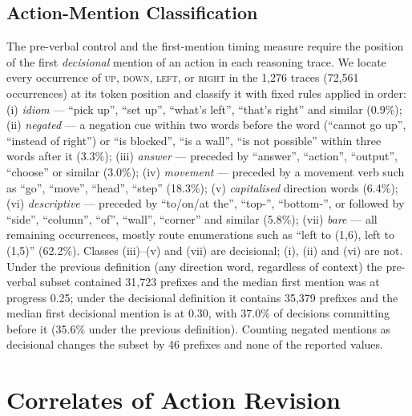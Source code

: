 \documentclass{article}
\begin{document}
\subsection{Action-Mention Classification}
\label{app:action-mentions}
The pre-verbal control and the first-mention timing measure require the position of the first \emph{decisional} mention of an action in each reasoning trace.
We locate every occurrence of \textsc{up}, \textsc{down}, \textsc{left}, or \textsc{right} in the 1,276 traces (72,561 occurrences) at its token position and classify it with fixed rules applied in order: (i) \emph{idiom} --- ``pick up'', ``set up'', ``what's left'', ``that's right'' and similar (0.9\%); (ii) \emph{negated} --- a negation cue within two words before the word (``cannot go up'', ``instead of right'') or ``is blocked'', ``is a wall'', ``is not possible'' within three words after it (3.3\%); (iii) \emph{answer} --- preceded by ``answer'', ``action'', ``output'', ``choose'' or similar (3.0\%); (iv) \emph{movement} --- preceded by a movement verb such as ``go'', ``move'', ``head'', ``step'' (18.3\%); (v) \emph{capitalised} direction words (6.4\%); (vi) \emph{descriptive} --- preceded by ``to/on/at the'', ``top-'', ``bottom-'', or followed by ``side'', ``column'', ``of'', ``wall'', ``corner'' and similar (5.8\%); (vii) \emph{bare} --- all remaining occurrences, mostly route enumerations such as ``left to (1,6), left to (1,5)'' (62.2\%).
Classes (iii)--(v) and (vii) are decisional; (i), (ii) and (vi) are not.
Under the previous definition (any direction word, regardless of context) the pre-verbal subset contained 31,723 prefixes and the median first mention was at progress 0.25; under the decisional definition it contains 35,379 prefixes and the median first decisional mention is at 0.30, with 37.0\% of decisions committing before it (35.6\% under the previous definition).
Counting negated mentions as decisional changes the subset by 46 prefixes and none of the reported values.


\section{Correlates of Action Revision}\label{app:action-revision-correlates}
\label{app:additional-reasoning}
\end{document}

